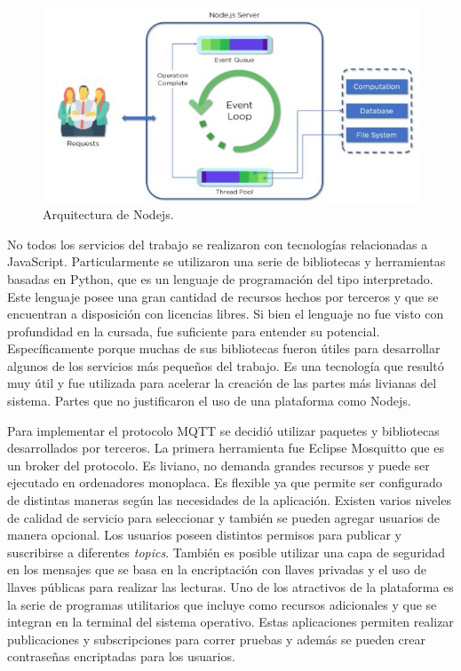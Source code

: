 \begin{figure}[h]
	\centering
	\includegraphics[width=\textwidth]{./Figures/ch2Nodejs.jpeg}
	\caption{Arquitectura de Nodejs. \citep{WEBSITE:nodejs}}
	\label{fig:ch2Nodejs}
\end{figure}

No todos los servicios del trabajo se realizaron con tecnologías relacionadas a JavaScript.
Particularmente se utilizaron una serie de bibliotecas y herramientas basadas en Python, que es un lenguaje de programación del tipo interpretado.
Este lenguaje posee una gran cantidad de recursos hechos por terceros y que se encuentran a disposición con licencias libres.
Si bien el lenguaje no fue visto con profundidad en la cursada, fue suficiente para entender su potencial.
Específicamente porque muchas de sus bibliotecas fueron útiles para desarrollar algunos de los servicios más pequeños del trabajo.
Es una tecnología que resultó muy útil y fue utilizada para acelerar la creación de las partes más livianas del sistema.
Partes que no justificaron el uso de una plataforma como Nodejs.

Para implementar el protocolo MQTT se decidió utilizar paquetes y bibliotecas desarrollados por terceros.
La primera herramienta fue Eclipse Mosquitto que es un broker del protocolo.
Es liviano, no demanda grandes recursos y puede ser ejecutado en ordenadores monoplaca.
Es flexible ya que permite ser configurado de distintas maneras según las necesidades de la aplicación.
Existen varios niveles de calidad de servicio para seleccionar y también se pueden agregar usuarios de manera opcional.
Los usuarios poseen distintos permisos para publicar y suscribirse a diferentes \emph{topics}.
También es posible utilizar una capa de seguridad en los mensajes que se basa en la encriptación con llaves privadas y el uso de llaves públicas para realizar las lecturas.
Uno de los atractivos de la plataforma es la serie de programas utilitarios que incluye como recursos adicionales y que se integran en la terminal del sistema operativo.
Estas aplicaciones permiten realizar publicaciones y subscripciones para correr pruebas y además se pueden crear contraseñas encriptadas para los usuarios.


